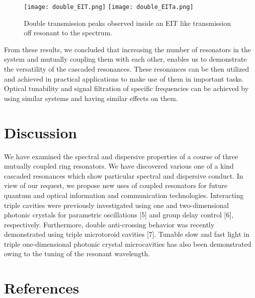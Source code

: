\begin{figure}[t]
\centering
\texttt{[image: double\_EIT.png]}
\texttt{[image: double\_EITa.png]}
\caption{Double transmission peaks observed inside an EIT like transmission off resonant to the spectrum.}
\end{figure}


From these results, we concluded that increasing the number of resonators in the system and mutually coupling them with each other, enables us to demonstrate the versatility of the cascaded resonances. These resonances can be then utilized and achieved in practical applications to make use of them in important tasks. Optical tunability and signal filtration of specific frequencies can be achieved by using similar systems and having similar effects on them.

\newpage
\section{Discussion}
We have examined the spectral and dispersive properties of a course of three mutually coupled ring resonators. We have discovered various one of a kind cascaded resonances which show particular spectral and dispersive conduct. In view of our request, we propose new uses of coupled resonators for future quantum and optical information and communication technologies. Interacting triple cavities were previously investigated using one and two-dimensional photonic crystals for parametric oscillations [5] and group delay control [6], respectively. Furthermore, double anti-crossing behavior was recently demonstrated using triple microtoroid cavities [7]. Tunable slow and fast light in triple one-dimensional photonic crystal microcavities has also been demonstrated owing to the tuning of the resonant wavelength.

\newpage
\section*{References}

